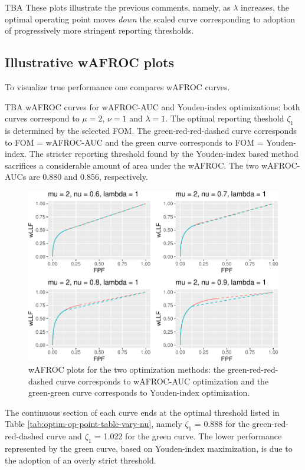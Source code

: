 \documentclass[
]{book}
\begin{document}
TBA These plots illustrate the previous comments, namely, as \(\lambda\) increases, the optimal operating point moves \emph{down} the scaled curve corresponding to adoption of progressively more stringent reporting thresholds.

\hypertarget{illustrative-wafroc-plots}{%
\subsection{Illustrative wAFROC plots}\label{illustrative-wafroc-plots}}

To visualize true performance one compares wAFROC curves.

TBA wAFROC curves for wAFROC-AUC and Youden-index optimizations: both curves correspond to \(\mu = 2\), \(\nu = 1\) and \(\lambda = 1\). The optimal reporting theshold \(\zeta_1\) is determined by the selected FOM. The green-red-red-dashed curve corresponds to FOM = wAFROC-AUC and the green curve corresponds to FOM = Youden-index. The stricter reporting threshold found by the Youden-index based method sacrifices a considerable amount of area under the wAFROC. The two wAFROC-AUCs are 0.880 and 0.856, respectively.

\begin{figure}
\centering
\includegraphics{21-optim-op-point_files/figure-latex/optim-op-point-vary-nu-wafroc-1.pdf}
\caption{\label{fig:optim-op-point-vary-nu-wafroc}wAFROC plots for the two optimization methods: the green-red-red-dashed curve corresponds to wAFROC-AUC optimization and the green-green curve corresponds to Youden-index optimization.}
\end{figure}

The continuous section of each curve ends at the optimal threshold listed in Table \ref{tab:optim-op-point-table-vary-nu}, namely \(\zeta_1\) = 0.888 for the green-red-red-dashed curve and \(\zeta_1\) = 1.022 for the green curve. The lower performance represented by the green curve, based on Youden-index maximization, is due to the adoption of an overly strict threshold.
\end{document}

